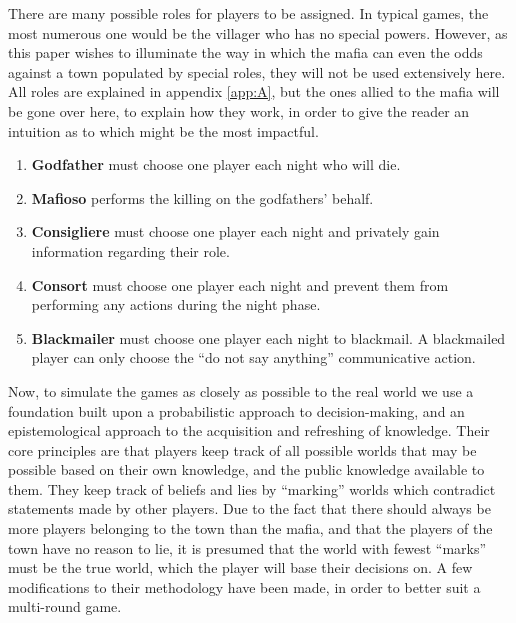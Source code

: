 There are many possible roles for players to be assigned. In typical games, the
most numerous one would be the villager who has no special powers. However, as
this paper wishes to illuminate the way in which the mafia can even the odds
against a town populated by special roles, they will not be used extensively
here. All roles are explained in appendix \ref{app:A}, but the ones allied to
the mafia will be gone over here, to explain how they work, in order to give
the reader an intuition as to which might be the most impactful.

\begin{enumerate}
	\itemsep0px
	\item\textbf{Godfather} must choose one player each night who will die.
	\item\textbf{Mafioso} performs the killing on the godfathers' behalf.
	\item\textbf{Consigliere} must choose one player each night and privately
	      gain information regarding their role.
	\item\textbf{Consort} must choose one player each night and prevent them
	      from performing any actions during the night phase.
	\item\textbf{Blackmailer} must choose one player each night to blackmail. A
	      blackmailed player can only choose the “do not say anything” communicative
	      action.
\end{enumerate}

Now, to simulate the games as closely as possible to the real world we use a
foundation built upon a probabilistic approach to decision-making, and an
epistemological approach to the acquisition and refreshing of
knowledge\cite{commitment}. Their core principles are that players keep track
of all possible worlds that may be possible based on their own knowledge, and
the public knowledge available to them. They keep track of beliefs and lies by
“marking” worlds which contradict statements made by other players. Due to the
fact that there should always be more players belonging to the town than the
mafia, and that the players of the town have no reason to lie, it is presumed
that the world with fewest “marks” must be the true world, which the player
will base their decisions on. A few modifications to their methodology have
been made, in order to better suit a multi-round game.

